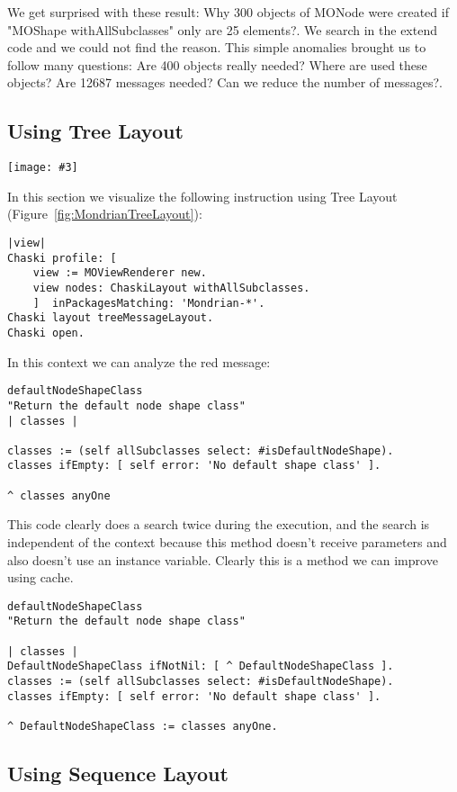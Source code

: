 \documentclass{sig-alternate}
\newcommand{\largefig}[4]{
	\begin{figure*}[#1]
		\centering
		\texttt{[image: \#3]}
		\caption{\label{fig:#3}#4}
	\end{figure*}}
\newcommand{\figref}[1]{Figure~\ref{fig:#1}}
\begin{document}
We get surprised with these result: Why 300 objects of MONode were created if "MOShape withAllSubclasses" only are 25 elements?. We search in the extend code and we could not find the reason. This simple anomalies brought us to follow many questions: Are 400 objects really needed? Where are used these objects? Are 12687 messages needed? Can we reduce the number of messages?.

\subsection{Using Tree Layout}

\largefig{}{1.0}{MondrianTreeLayout}{Mondrian Tree Layout}

In this section we visualize the following instruction using Tree Layout (\figref{MondrianTreeLayout}):
\begin{lstlisting}[language=Smalltalk]
|view|
Chaski profile: [
	view := MOViewRenderer new.
	view nodes: ChaskiLayout withAllSubclasses.
	]  inPackagesMatching: 'Mondrian-*'.
Chaski layout treeMessageLayout.
Chaski open.
\end{lstlisting}


In this context we can analyze the red message:
\begin{lstlisting}[language=Smalltalk]
defaultNodeShapeClass
"Return the default node shape class"
| classes |

classes := (self allSubclasses select: #isDefaultNodeShape).
classes ifEmpty: [ self error: 'No default shape class' ].

^ classes anyOne
\end{lstlisting}

This code clearly does a search twice during the execution, and the search is independent of the context because this method doesn't receive parameters and also doesn't use an instance variable. Clearly this is a method we can improve using cache.
\begin{lstlisting}[language=Smalltalk]
defaultNodeShapeClass
"Return the default node shape class"

| classes |
DefaultNodeShapeClass ifNotNil: [ ^ DefaultNodeShapeClass ].
classes := (self allSubclasses select: #isDefaultNodeShape).
classes ifEmpty: [ self error: 'No default shape class' ].

^ DefaultNodeShapeClass := classes anyOne.

\end{lstlisting}

\subsection{Using Sequence Layout}
\end{document}
